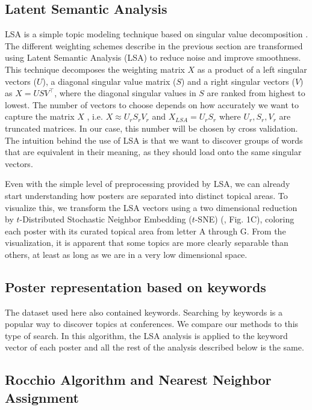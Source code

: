 \documentclass[a4paper]{article}
\begin{document}
\subsection{Latent Semantic Analysis}

LSA is a simple topic modeling technique based on singular value decomposition \cite{landauer1998introduction}. The
different weighting schemes describe in the previous section
are transformed using Latent Semantic Analysis (LSA) to reduce noise and improve smoothness. This technique decomposes the weighting matrix $X$ as a product of a left singular vectors ($U$), a diagonal singular value matrix ($S$) and a right singular vectors ($V$) as $X = USV^\top$, where the diagonal singular values in $S$ are ranked from highest to lowest. The number of vectors to choose depends on how accurately we want to capture the matrix $X$ \cite{bishop2006pattern}, i.e. $X \approx U_r S_r V_r$ and $X_{LSA} = U_r S_r$ where $U_r, S_r, V_r$ are truncated matrices. In our case, this number will be chosen by cross validation. The intuition behind the use of LSA is that we want to discover groups of words that are equivalent in their meaning, as they should load onto the same singular vectors.


Even with the simple level of preprocessing provided by LSA, we can already start understanding how posters are separated into distinct topical areas. To visualize this, we transform the LSA vectors using a two dimensional reduction by $t$-Distributed Stochastic Neighbor Embedding ($t$-SNE) (\cite{van2008visualizing}, Fig. 1C), coloring each poster with its curated topical area from letter A through G. From the visualization, it is apparent that some topics are more clearly separable than others, at least as long as we are in a very low dimensional space.

\subsection{Poster representation based on keywords}

The dataset used here also contained keywords. Searching by keywords is a popular way to discover topics at conferences. We compare our methods to this type of search. In this algorithm, the LSA analysis is applied to the keyword vector of each poster and all the rest of the analysis described below is the same.


\subsection{Rocchio Algorithm and Nearest Neighbor Assignment}
\end{document}

